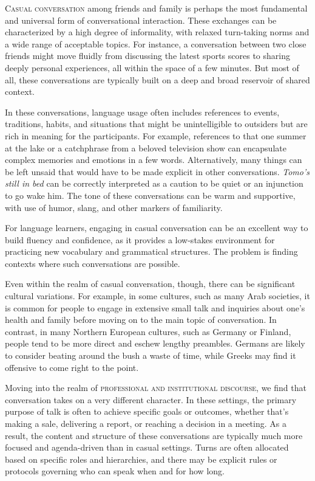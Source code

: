 \textsc{Casual conversation} among friends and family is perhaps the most fundamental and universal form of conversational interaction. These exchanges can be characterized by a high degree of informality, with relaxed turn-taking norms and a wide range of acceptable topics. For instance, a conversation between two close friends might move fluidly from discussing the latest sports scores to sharing deeply personal experiences, all within the space of a few minutes. But most of all, these conversations are typically built on a deep and broad reservoir of shared context. 

In these conversations, language usage often includes references to events, traditions, habits, and situations that might be unintelligible to outsiders but are rich in meaning for the participants. For example, references to that one summer at the lake or a catchphrase from a beloved television show can encapsulate complex memories and emotions in a few words. Alternatively, many things can be left unsaid that would have to be made explicit in other conversations. \textit{Tomo's still in bed} can be correctly interpreted as a caution to be quiet or an injunction to go wake him. The tone of these conversations can be warm and supportive, with use of humor, slang, and other markers of familiarity.

For language learners, engaging in casual conversation can be an excellent way to build fluency and confidence, as it provides a low-stakes environment for practicing new vocabulary and grammatical structures. The problem is finding contexts where such conversations are possible.

Even within the realm of casual conversation, though, there can be significant cultural variations. For example, in some cultures, such as many Arab societies, it is common for people to engage in extensive small talk and inquiries about one's health and family before moving on to the main topic of conversation. In contrast, in many Northern European cultures, such as Germany or Finland, people tend to be more direct and eschew lengthy preambles. Germans are likely to consider beating around the bush a waste of time, while Greeks may find it offensive to come right to the point.

Moving into the realm of \textsc{professional and institutional discourse}, we find that conversation takes on a very different character. In these settings, the primary purpose of talk is often to achieve specific goals or outcomes, whether that's making a sale, delivering a report, or reaching a decision in a meeting. As a result, the content and structure of these conversations are typically much more focused and agenda-driven than in casual settings. Turns are often allocated based on specific roles and hierarchies, and there may be explicit rules or protocols governing who can speak when and for how long.

